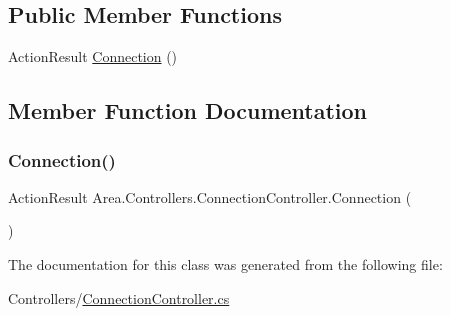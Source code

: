 \subsection*{Public Member Functions}
\begin{DoxyCompactItemize}
\item 
Action\+Result \mbox{\hyperlink{classArea_1_1Controllers_1_1ConnectionController_a17da8a2a6e745d7c9d516e90a423c8c0}{Connection}} ()
\end{DoxyCompactItemize}


\subsection{Member Function Documentation}
\mbox{\label{classArea_1_1Controllers_1_1ConnectionController_a17da8a2a6e745d7c9d516e90a423c8c0}} 
\subsubsection{\texorpdfstring{Connection()}{Connection()}}
{\footnotesize\ttfamily Action\+Result Area.\+Controllers.\+Connection\+Controller.\+Connection (\begin{DoxyParamCaption}{ }\end{DoxyParamCaption})\hspace{0.3cm}{\ttfamily [inline]}}



The documentation for this class was generated from the following file\+:\begin{DoxyCompactItemize}
\item 
Controllers/\mbox{\hyperlink{ConnectionController_8cs}{Connection\+Controller.\+cs}}\end{DoxyCompactItemize}
